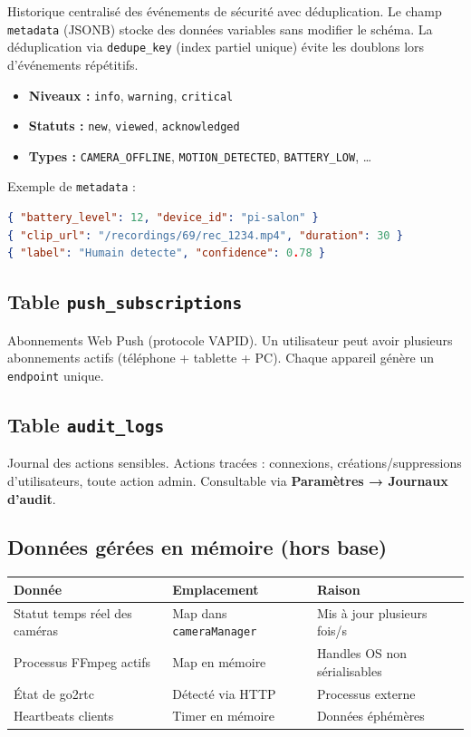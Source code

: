 \documentclass[12pt,a4paper]{article}
\begin{document}
Historique centralisé des événements de sécurité avec déduplication.
Le champ \texttt{metadata} (JSONB) stocke des données variables sans modifier le schéma.
La déduplication via \texttt{dedupe\_key} (index partiel unique) évite les doublons
lors d'événements répétitifs.

\begin{itemize}
  \item \textbf{Niveaux :} \texttt{info}, \texttt{warning}, \texttt{critical}
  \item \textbf{Statuts :} \texttt{new}, \texttt{viewed}, \texttt{acknowledged}
  \item \textbf{Types :} \texttt{CAMERA\_OFFLINE}, \texttt{MOTION\_DETECTED}, \texttt{BATTERY\_LOW}, \ldots
\end{itemize}

Exemple de \texttt{metadata} :
\begin{lstlisting}[language=json]
{ "battery_level": 12, "device_id": "pi-salon" }
{ "clip_url": "/recordings/69/rec_1234.mp4", "duration": 30 }
{ "label": "Humain detecte", "confidence": 0.78 }
\end{lstlisting}

\subsection{Table \texttt{push\_subscriptions}}

Abonnements Web Push (protocole VAPID). Un utilisateur peut avoir plusieurs abonnements
actifs (téléphone + tablette + PC). Chaque appareil génère un \texttt{endpoint} unique.

\subsection{Table \texttt{audit\_logs}}

Journal des actions sensibles. Actions tracées : connexions, créations/suppressions
d'utilisateurs, toute action admin. Consultable via \textbf{Paramètres → Journaux d'audit}.

\subsection{Données gérées en mémoire (hors base)}

\begin{longtable}{|l|p{4cm}|p{5cm}|}
\hline
\textbf{Donnée} & \textbf{Emplacement} & \textbf{Raison} \\
\hline
\endhead
\hline
\endfoot
Statut temps réel des caméras & Map dans \texttt{cameraManager} & Mis à jour plusieurs fois/s \\
Processus FFmpeg actifs & Map en mémoire & Handles OS non sérialisables \\
État de go2rtc & Détecté via HTTP & Processus externe \\
Heartbeats clients & Timer en mémoire & Données éphémères \\
\hline
\end{longtable}
\end{document}
